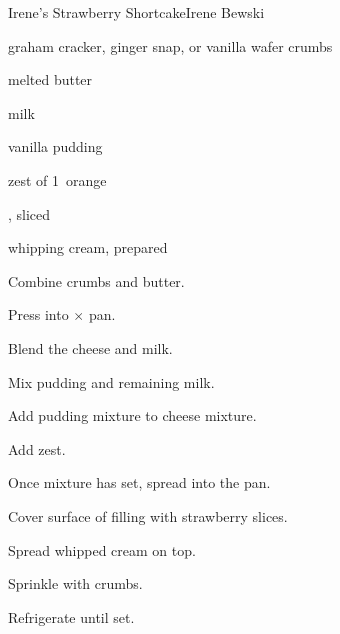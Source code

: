 \begin{recipe}{Irene's Strawberry Shortcake}{Irene Bewski}{}

\begin{ingredients}
\item \C{2\half} graham cracker, ginger snap, or vanilla wafer crumbs
\item \C{\half} melted butter
\item {} 
\item \C{1\threequarter} milk
\item \oz{3\quarter} vanilla pudding
\item zest of 1~orange
\item {} , sliced
\item whipping cream, prepared
\end{ingredients}

\begin{directions}
\item Combine crumbs and butter.
\item Press into $\times$ pan.
\item Blend the cheese and \C{\half} milk.
\item Mix pudding and remaining milk.
\item Add pudding mixture to cheese mixture.
\item Add zest.
\item Once mixture has set, spread into the pan.
\item Cover surface of filling with strawberry slices.
\item Spread whipped cream on top.
\item Sprinkle with crumbs.
\item Refrigerate until set.
\end{directions}

\end{recipe}
